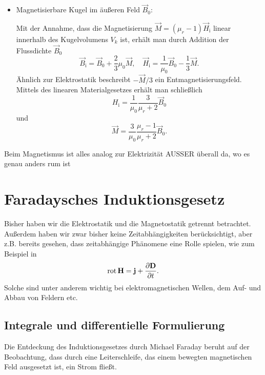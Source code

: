 \begin{itemize}
	\item Magnetisierbare Kugel im äußeren Feld $\vec {B}_{0}$:

	      Mit der Annahme, dass die Magnetisierung $\vec {M}=\left(\mu _{r}-1\right)\vec {H}_{\mathrm{i}}$ linear innerhalb des Kugelvolumens $V_{k}$ ist, erhält man durch Addition der Flussdichte $\vec {B}_{0}$
	      \begin{equation*}
		      \vec {B}_{\mathrm{i}}=\vec {B}_{0}+\frac{2}{3}\mu _{0}\vec {M},\quad \vec {H}_{\mathrm{i}}=\frac{1}{\mu _{0}}\vec {B}_{0}-\frac{1}{3}\vec {M}.
	      \end{equation*}
	      Ähnlich zur Elektrostatik beschreibt $-\vec {M}/3$ ein Entmagnetisierungsfeld. Mittels des linearen Materialgesetzes erhält man schließlich
	      \begin{equation*}
		      H_{\mathrm{i}}=\frac{1}{\mu _{0}}\frac{3}{\mu _{r}+2}\vec {B}_{0}
	      \end{equation*}
	      und
	      \begin{equation*}
		      \vec {M}=\frac{3}{\mu _{0}}\frac{\mu _{r}-1}{\mu _{r}+2}\vec {B}_{0}.
	      \end{equation*}
\end{itemize}

Beim Magnetismus ist alles analog zur Elektrizität AUSSER überall da, wo es genau anders rum ist

\section{Faradaysches Induktionsgesetz}

Bisher haben wir die Elektrostatik und die Magnetostatik getrennt betrachtet. Außerdem haben wir zwar bisher keine Zeitabhängigkeiten berücksichtigt, aber z.B. bereits gesehen, dass zeitabhängige Phänomene eine Rolle spielen, wie zum Beispiel in
\begin{equation*}
	\operatorname{rot} \mathbf{H}=\mathbf{j}+\frac{\partial \mathbf{D}}{\partial t}.
\end{equation*}
Solche sind unter anderem wichtig bei elektromagnetischen Wellen, dem Auf- und Abbau von Feldern etc.

\subsection{Integrale und differentielle Formulierung}

Die Entdeckung des Induktionsgesetzes durch Michael Faraday beruht auf der Beobachtung, dass durch eine Leiterschleife, das einem bewegten magnetischen Feld ausgesetzt ist, ein Strom fließt.

